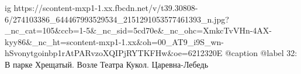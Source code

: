  
 
 
 
 

\ifcmt
  ig https://scontent-mxp1-1.xx.fbcdn.net/v/t39.30808-6/274103386_644467993529534_2151291053577461393_n.jpg?_nc_cat=105&ccb=1-5&_nc_sid=5cd70e&_nc_ohc=XmkcTvVHn-4AX-kyy86&_nc_ht=scontent-mxp1-1.xx&oh=00_AT9_i9S_wn-hSvonytgoinbp1rAtPARvzoXQIPjRYTKFHw&oe=6212320E
  @caption @label 32: В парке Хрещатый. Возле Театра Кукол. Царевна-Лебедь
\fi
